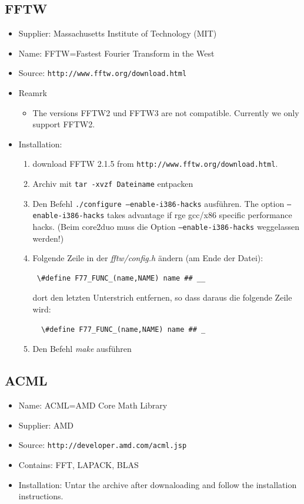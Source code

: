 \documentclass[a4paper,10pt]{report}
\newcommand{\mytt}[1]{{\tt #1}}
\begin{document}
\subsection{FFTW}
\label{sec:FFTWinstall}
\begin{itemize}
\item Supplier: Massachusetts Institute of Technology (MIT)
\item Name: FFTW=Fastest Fourier Transform in the West
\item Source: \mytt{http://www.fftw.org/download.html}
\item Reamrk
\begin{itemize}
\item The versions FFTW2 und FFTW3 are not compatible. Currently we only support FFTW2.
\end{itemize}
\item Installation:
\begin{enumerate}
\item download FFTW 2.1.5 from \mytt{http://www.fftw.org/download.html}.
\item Archiv mit \mytt{tar -xvzf Dateiname} entpacken
 \item Den Befehl \mytt{./configure --enable-i386-hacks} ausf\"uhren.
 The option \mytt{--enable-i386-hacks} takes advantage if rge gcc/x86
 specific performance hacks. (Beim core2duo muss die Option
 \mytt{--enable-i386-hacks} weggelassen werden!)
\item Folgende Zeile in der \textit{fftw/config.h} ändern (am Ende der Datei):\\
\begin{verbatim}
 \#define F77_FUNC_(name,NAME) name ## __
\end{verbatim}
 dort den letzten Unterstrich entfernen, so dass daraus die folgende Zeile wird:
\begin{verbatim}
  \#define F77_FUNC_(name,NAME) name ## _ 
\end{verbatim}
 \item  Den Befehl \textit{make} ausführen
\end{enumerate}
\end{itemize}


\subsection{ACML}
\label{sec:acml}
\begin{itemize}
\item Name: ACML=AMD Core Math Library
\item Supplier: AMD
\item Source: \mytt{http://developer.amd.com/acml.jsp}
\item Contains: FFT, LAPACK, BLAS
\item Installation: Untar the archive after downaloading and follow
the installation instructions.
\end{itemize}
\end{document}

